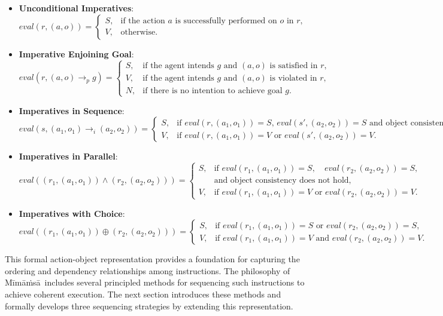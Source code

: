 \documentclass[a4paper,11pt]{lmcs}
\newcommand{\mimamsa}{M\={i}m\={a}\.ms\={a}}
\begin{document}
\begin{itemize}
 \item \textbf{Unconditional Imperatives}:
\[
eval(r, (a, o)) =
\begin{cases}
S, & \text{if the action } a \text{ is successfully performed on } o \text{ in } r, \\
V, & \text{otherwise}.
\end{cases}
\]

\item \textbf{Imperative Enjoining Goal}:
\[
eval(r, (a, o) \rightarrow_p g) =
\begin{cases}
S, & \text{if the agent intends } g \text{ and } (a,o) \text{ is satisfied in } r, \\
V, & \text{if the agent intends } g \text{ and } (a,o) \text{ is violated in } r, \\
N, & \text{if there is no intention to achieve goal } g.
\end{cases}
\]

\item \textbf{Imperatives in Sequence}:
\[
eval(s, (a_1, o_1) \rightarrow_i (a_2, o_2)) =
\begin{cases}
S, & \text{if } eval(r, (a_1, o_1)) = S \text{, } eval(s', (a_2, o_2)) = S \text{ and object consistency holds,} \\
V, & \text{if } eval(r, (a_1, o_1)) = V \text{ or } eval(s', (a_2, o_2)) = V.
\end{cases}
\]

\item \textbf{Imperatives in Parallel}:
\[
eval((r_1, (a_1, o_1)) \wedge (r_2, (a_2, o_2))) =
\begin{cases}
S, & \text{if } eval(r_1, (a_1, o_1)) = S, \quad eval(r_2, (a_2, o_2)) = S, \\
& \text{and object consistency does not hold,} \\
V, & \text{if } eval(r_1, (a_1, o_1)) = V \text{ or } eval(r_2, (a_2, o_2)) = V.
\end{cases}
\]

\item \textbf{Imperatives with Choice}:
\[
eval((r_1, (a_1, o_1)) \oplus (r_2, (a_2, o_2))) =
\begin{cases}
S, & \text{if } eval(r_1, (a_1, o_1)) = S \text{ or } eval(r_2, (a_2, o_2)) = S, \\
V, & \text{if } eval(r_1, (a_1, o_1)) = V \text{ and } eval(r_2, (a_2, o_2)) = V.
\end{cases}
\]
\end{itemize}
This formal action-object representation provides a foundation for capturing the ordering and dependency relationships among instructions. The philosophy of \mimamsa\ includes several principled methods for sequencing such instructions to achieve coherent execution. The next section introduces these methods and formally develops three sequencing strategies by extending this representation.
\end{document}
